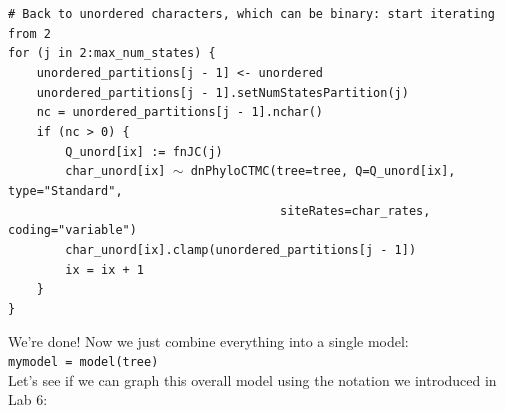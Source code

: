 \documentclass[12pt]{article}
\begin{document}
\begin{flushright}
{\begin{minipage}{16.52cm}
{\hspace*{12pt} \texttt{\# Back to unordered characters, which can be binary: start iterating from 2} \\[-0.5ex]
\hspace*{12pt} \texttt{for (j in 2:max\_num\_states) \{} \\[-0.5ex]
\hspace*{12pt} \texttt{\ \ \ \ unordered\_partitions[j - 1] <- unordered} \\[-0.5ex]
\hspace*{12pt} \texttt{\ \ \ \ unordered\_partitions[j - 1].setNumStatesPartition(j)} \\[-0.5ex]
\hspace*{12pt} \texttt{\ \ \ \ nc = unordered\_partitions[j - 1].nchar()} \\[-0.5ex]
\hspace*{12pt} \texttt{\ \ \ \ if (nc > 0) \{} \\[-0.5ex]
\hspace*{12pt} \texttt{\ \ \ \ \ \ \ \ Q\_unord[ix] := fnJC(j)} \\[-0.5ex]
\hspace*{12pt} \texttt{\ \ \ \ \ \ \ \ char\_unord[ix] {\footnotesize $\sim$} dnPhyloCTMC(tree=tree, Q=Q\_unord[ix], type="Standard",} \\[-0.5ex]
\hspace*{12pt} \texttt{\ \ \ \ \ \ \ \ \ \ \ \ \ \ \ \ \ \ \ \ \ \ \ \ \ \ \ \ \ \ \ \ \ \, \ \ \ siteRates=char\_rates, coding="variable")} \\[-0.5ex]
\hspace*{12pt} \texttt{\ \ \ \ \ \ \ \ char\_unord[ix].clamp(unordered\_partitions[j - 1])} \\[-0.5ex]
\hspace*{12pt} \texttt{\ \ \ \ \ \ \ \ ix = ix + 1} \\[-0.5ex]
\hspace*{12pt} \texttt{\ \ \ \ \}} \\[-0.5ex]
\hspace*{12pt} \texttt{\}}
}
\end{minipage}}
\end{flushright}

\noindent We're done! Now we just combine everything into a single model: \\

\indent \texttt{mymodel = model(tree)} \\ 

\noindent Let's see if we can graph this overall model using the notation we introduced in Lab 6: \\
\end{document}
